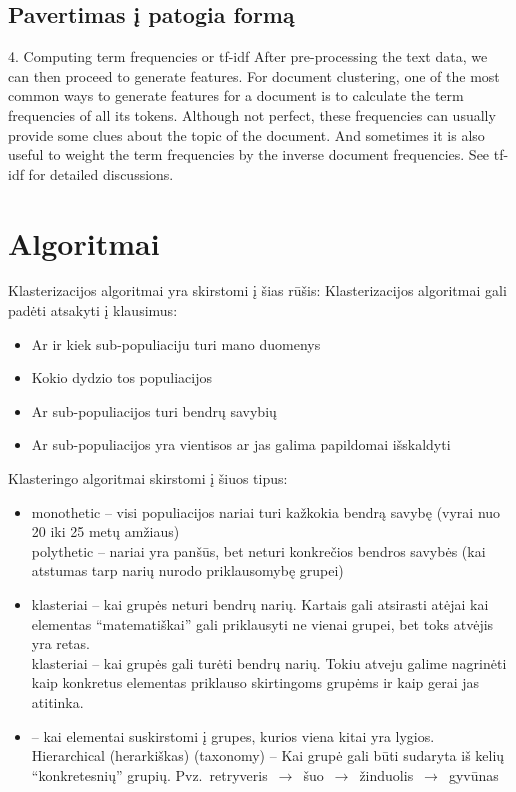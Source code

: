 \documentclass{VUMIFInfKursinis}
\begin{document}
\subsection{Pavertimas į patogia formą}
4. Computing term frequencies or tf-idf
After pre-processing the text data, we can then proceed to generate features. For document clustering, one of the most common ways to generate features for a document is to calculate the term frequencies of all its tokens. Although not perfect, these frequencies can usually provide some clues about the topic of the document. And sometimes it is also useful to weight the term frequencies by the inverse document frequencies. See tf-idf for detailed discussions.

\section{Algoritmai}
Klasterizacijos algoritmai yra skirstomi į šias rūšis:
Klasterizacijos algoritmai gali padėti atsakyti į klausimus:
\begin{itemize}
	\item Ar ir kiek sub-populiaciju turi mano duomenys
	\item Kokio dydzio tos populiacijos
	\item Ar sub-populiacijos turi bendrų savybių
	\item Ar sub-populiacijos yra vientisos ar jas galima papildomai išskaldyti
\end{itemize}
Klasteringo algoritmai skirstomi į šiuos tipus:
\begin{itemize}
	\item monothetic – visi populiacijos nariai turi kažkokia bendrą savybę (vyrai nuo 20 iki 25 metų amžiaus)
		\\polythetic – nariai yra panšūs, bet neturi konkrečios bendros savybės (kai atstumas tarp narių nurodo priklausomybę grupei)
	\item {} klasteriai – kai grupės neturi bendrų narių. Kartais gali atsirasti atėjai kai elementas “matematiškai” gali priklausyti ne vienai grupei, bet toks atvėjis yra retas.
		\\ klasteriai – kai grupės gali turėti bendrų narių. Tokiu atveju galime nagrinėti kaip konkretus elementas priklauso skirtingoms grupėms ir kaip gerai jas atitinka.
	\item {} – kai elementai suskirstomi į grupes, kurios viena kitai yra lygios.
		\\Hierarchical (herarkiškas) (taxonomy) – Kai grupė gali būti sudaryta iš kelių “konkretesnių” grupių. Pvz.\ retryveris $\,\to\,$ šuo $\,\to\,$ žinduolis $\,\to\,$ gyvūnas
\end{itemize}
\end{document}
